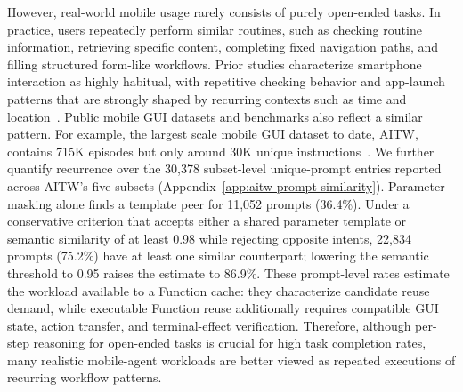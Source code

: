 However, real-world mobile usage rarely consists of purely open-ended tasks.
In practice, users repeatedly perform similar routines, such as checking routine information, retrieving specific content, completing fixed navigation paths, and filling structured form-like workflows.
Prior studies characterize smartphone interaction as highly habitual, with repetitive checking behavior and app-launch patterns that are strongly shaped by recurring contexts such as time and location~\cite{oulasvirta2012habits,yan2012fast}.
Public mobile GUI datasets and benchmarks also reflect a similar pattern.
For example, the largest scale mobile GUI dataset to date, AITW, contains 715K episodes but only around 30K unique instructions~\cite{rawles2023android}.
We further quantify recurrence over the 30,378 subset-level unique-prompt entries reported across AITW's five subsets (Appendix~\ref{app:aitw-prompt-similarity}).  Parameter masking alone finds a template peer for 11,052 prompts (36.4\%).  Under a conservative criterion that accepts either a shared parameter template or semantic similarity of at least 0.98 while rejecting opposite intents, 22,834 prompts (75.2\%) have at least one similar counterpart; lowering the semantic threshold to 0.95 raises the estimate to 86.9\%.  These prompt-level rates estimate the workload available to a Function cache: they characterize candidate reuse demand, while executable Function reuse additionally requires compatible GUI state, action transfer, and terminal-effect verification.
Therefore, although per-step reasoning for open-ended tasks is crucial for high task completion rates, many realistic mobile-agent workloads are better viewed as repeated executions of recurring workflow patterns.

